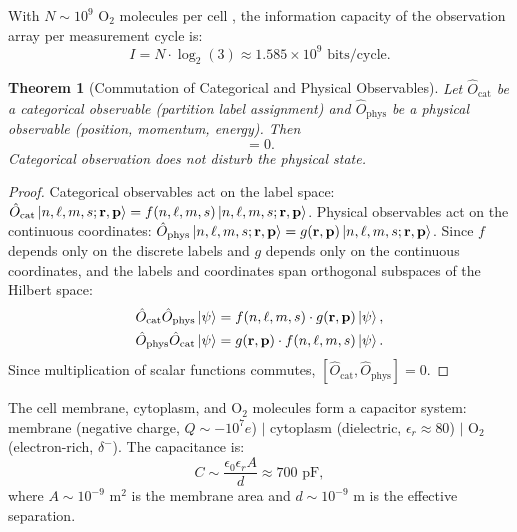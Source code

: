 \documentclass[twocolumn,10pt,a4paper]{article}
\newtheorem{theorem}{Theorem}[section]
\theoremstyle{definition}
\theoremstyle{remark}
\begin{document}
With $N \sim 10^9$ O$_2$ molecules per cell \citep{NichollsFerguson2002}, the information capacity of the observation array per measurement cycle is:
\begin{equation}
    I = N \cdot \log_2(3) \approx 1.585 \times 10^9 \text{ bits/cycle}.
    \label{eq:info_capacity}
\end{equation}

\begin{theorem}[Commutation of Categorical and Physical Observables]
\label{thm:commutation}
Let $\hat{O}_{\mathrm{cat}}$ be a categorical observable (partition label assignment) and $\hat{O}_{\mathrm{phys}}$ be a physical observable (position, momentum, energy). Then
\begin{equation}
    [\hat{O}_{\mathrm{cat}}, \hat{O}_{\mathrm{phys}}] = 0.
    \label{eq:commutation}
\end{equation}
Categorical observation does not disturb the physical state.
\end{theorem}

\begin{proof}
Categorical observables act on the label space: $\hat{O}_{\mathrm{cat}} \ket{n,\ell,m,s;\mathbf{r},\mathbf{p}} = f(n,\ell,m,s) \ket{n,\ell,m,s;\mathbf{r},\mathbf{p}}$. Physical observables act on the continuous coordinates: $\hat{O}_{\mathrm{phys}} \ket{n,\ell,m,s;\mathbf{r},\mathbf{p}} = g(\mathbf{r},\mathbf{p}) \ket{n,\ell,m,s;\mathbf{r},\mathbf{p}}$. Since $f$ depends only on the discrete labels and $g$ depends only on the continuous coordinates, and the labels and coordinates span orthogonal subspaces of the Hilbert space:
\begin{align}
    \hat{O}_{\mathrm{cat}} \hat{O}_{\mathrm{phys}} \ket{\psi} &= f(n,\ell,m,s) \cdot g(\mathbf{r},\mathbf{p}) \ket{\psi}, \\
    \hat{O}_{\mathrm{phys}} \hat{O}_{\mathrm{cat}} \ket{\psi} &= g(\mathbf{r},\mathbf{p}) \cdot f(n,\ell,m,s) \ket{\psi}.
\end{align}
Since multiplication of scalar functions commutes, $[\hat{O}_{\mathrm{cat}}, \hat{O}_{\mathrm{phys}}] = 0$.
\end{proof}

The cell membrane, cytoplasm, and O$_2$ molecules form a capacitor system: membrane (negative charge, $Q \sim -10^7 e$) $|$ cytoplasm (dielectric, $\epsilon_r \approx 80$) $|$ O$_2$ (electron-rich, $\delta^-$). The capacitance is:
\begin{equation}
    C \sim \frac{\epsilon_0 \epsilon_r A}{d} \approx 700 \text{ pF},
    \label{eq:capacitance}
\end{equation}
where $A \sim 10^{-9}$ m$^2$ is the membrane area and $d \sim 10^{-9}$ m is the effective separation.
\end{document}
